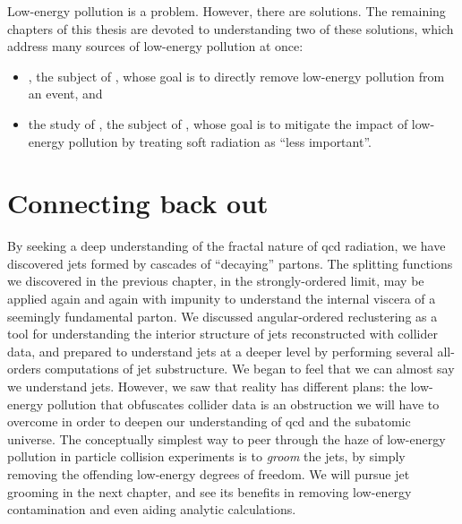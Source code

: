 

Low-energy pollution is a problem.
%
However, there are solutions.
%
The remaining chapters of this thesis are devoted to understanding two of these solutions, which address many sources of low-energy pollution at once:
\begin{itemize}
    \item
        , the subject of , whose goal is to directly remove low-energy pollution from an event, and

    \item
        the study of , the subject of , whose goal is to mitigate the impact of low-energy pollution by treating soft radiation as ``less important''.
\end{itemize}



\section{Connecting back out}

By seeking a deep understanding of the fractal nature of \gls{qcd} radiation, we have discovered jets formed by cascades of ``decaying'' partons.
%
The splitting functions we discovered in the previous chapter, in the strongly-ordered limit, may be applied again and again with impunity to understand the internal viscera of a seemingly fundamental parton.
%
We discussed angular-ordered \gls{reclustering} as a tool for understanding the interior structure of jets reconstructed with collider data, and prepared to understand jets at a deeper level by performing several all-orders computations of jet substructure.
%
We began to feel that we can almost say we understand jets.
%
However, we saw that reality has different plans:
%
the low-energy pollution that obfuscates collider data is an obstruction we will have to overcome in order to deepen our understanding of \gls{qcd} and the subatomic universe.
%
The conceptually simplest way to peer through the haze of low-energy pollution in particle collision experiments is to \textit{groom} the jets, by simply removing the offending low-energy degrees of freedom.
%
We will pursue jet grooming in the next chapter, and see its benefits in removing low-energy contamination and even aiding analytic calculations.



